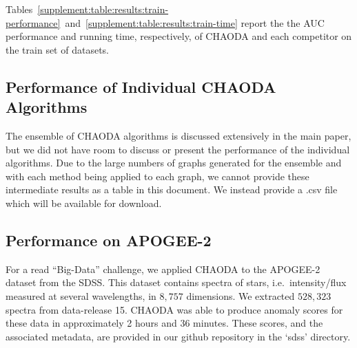 Tables~\ref{supplement:table:results:train-performance}~and~\ref{supplement:table:results:train-time} report the  the AUC performance and running time, respectively, of CHAODA and each competitor on the train set of datasets.

\subsection{Performance of Individual CHAODA Algorithms}

The ensemble of CHAODA algorithms is discussed extensively in the main paper, but we did not have room to discuss or present the performance of the individual algorithms.
Due to the large numbers of graphs generated for the ensemble and with each method being applied to each graph, we cannot provide these intermediate results as a table in this document.
We instead provide a .csv file which will be available for download.

\subsection{Performance on APOGEE-2}

For a read ``Big-Data'' challenge, we applied CHAODA to the APOGEE-2 dataset from the SDSS.
This dataset contains spectra of stars, i.e.\ intensity/flux measured at several wavelengths, in $8,757$ dimensions.
We extracted $528,323$ spectra from data-release 15.
CHAODA was able to produce anomaly scores for these data in approximately 2 hours and 36 minutes.
These scores, and the associated metadata, are provided in our github repository in the `sdss' directory.


